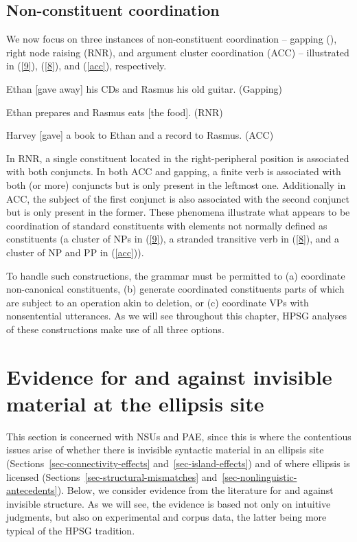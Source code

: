 \subsection{Non-constituent coordination}

We now focus on three instances of non-constituent coordination -- gapping (\citealt{Ross1967}), right node raising (RNR), and argument cluster coordination (ACC) -- illustrated in (\ref{9}), (\ref{8}), and (\ref{acc}), respectively.

 \ea Ethan [gave away] his CDs and Rasmus his old guitar. (Gapping)\label{9}\z

 \ea %
 Ethan prepares and Rasmus eats [the food]. (RNR)
 \label{8}\z

\ea Harvey [gave] a book to Ethan and a record to Rasmus. (ACC) \label{acc}\z

In RNR, a single constituent located in the right-peripheral position is associated with both conjuncts. In both ACC and gapping, a finite verb is associated with both (or more) conjuncts but is only present in the leftmost one. Additionally in ACC, the subject of the first conjunct is also associated with the second conjunct but is only present in the former. These phenomena illustrate what appears to be coordination of standard constituents with elements not normally defined as constituents (a cluster of NPs in (\ref{9}), a stranded transitive verb in (\ref{8}), and a cluster of NP and PP in (\ref{acc})).
%

 To handle such constructions, the grammar must be permitted to (a) coordinate non-canonical constituents, (b) generate coordinated constituents parts of which are subject to an operation akin to deletion, or (c) coordinate VPs with nonsentential utterances. As we will see throughout this chapter, HPSG analyses of these constructions make use of all three options.

\section{Evidence for and against invisible material at the ellipsis site}
\label{sec-evidence-for-invisible-material}

This section is concerned with NSUs and PAE, since this is where the contentious issues arise of
 whether there is invisible syntactic material in an ellipsis site (Sections~\ref{sec-connectivity-effects} and~\ref{sec-island-effects}) and of where ellipsis is licensed (Sections~\ref{sec-structural-mismatches} and~\ref{sec-nonlinguistic-antecedents}).  Below, we consider evidence from the literature for and against invisible structure. As we will see, the evidence is based not only on intuitive judgments, but also on experimental and corpus data, the latter being more typical of the HPSG tradition.


